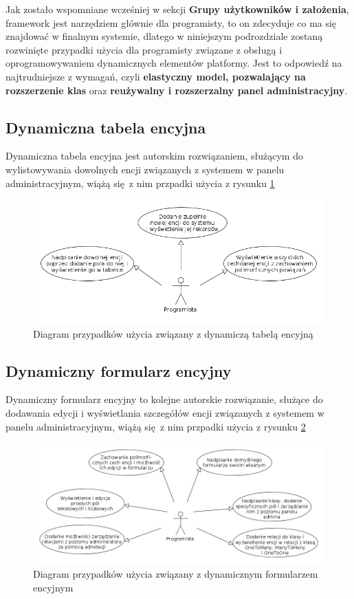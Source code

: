 Jak zostało wspomniane wcześniej w sekcji \textbf{Grupy użytkowników i założenia}, framework jest narzędziem głównie dla programisty, to on zdecyduje co ma się znajdować w finalnym systemie, dlatego w niniejszym podrozdziale zostaną rozwinięte przypadki użycia dla programisty związane z obsługą i oprogramowywaniem dynamicznych elementów platformy. Jest to odpowiedź na najtrudniejsze z wymagań, czyli \textbf{elastyczny model, pozwalający na rozszerzenie klas} oraz \textbf{reużywalny i rozszerzalny panel administracyjny}.
\subsection{Dynamiczna tabela encyjna}
Dynamiczna tabela encyjna jest autorskim rozwiązaniem, służącym do wylistowywania dowolnych encji związanych z systemem w panelu administracyjnym, wiążą się z nim przpadki użycia z rysunku \ref{dynEntTabUC}
\begin{figure}[H]
	\begin{center}
		\includegraphics[scale=0.5]{dynEntTabUC.png}
	\end{center}
	\caption{{\color{black}Diagram przypadków użycia związany z dynamiczą tabelą encyjną}} \label{dynEntTabUC}
\end{figure}

\subsection{Dynamiczny formularz encyjny}
Dynamiczny formularz encyjny to kolejne autorskie rozwiązanie, służące do dodawania edycji i wyświetlania szczegółów encji związanych z systemem w panelu administracyjnym, wiążą się z nim przpadki użycia z rysunku \ref{dynEntFormUC}
\begin{figure}[H]
	\begin{center}
		\includegraphics[scale=0.5]{dynEntFormUC.png}
	\end{center}
	\caption{{\color{black}Diagram przypadków użycia związany z dynamicznym formularzem encyjnym}} \label{dynEntFormUC}
\end{figure}

